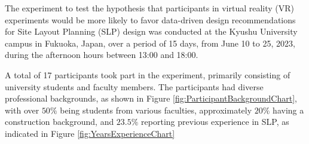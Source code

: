 
The experiment to test the hypothesis that participants in virtual reality (VR) experiments would be more likely to favor data-driven design recommendations for Site Layout Planning (SLP) design was conducted at the Kyushu University campus in Fukuoka, Japan, over a period of 15 days, from June 10 to 25, 2023, during the afternoon hours between 13:00 and 18:00.

A total of 17 participants took part in the experiment, primarily consisting of university students and faculty members.
The participants had diverse professional backgrounds, as shown in Figure \ref{fig:ParticipantBackgroundChart}, with over \(50\%\) being students from various faculties, approximately \(20\%\) having a construction background, and \(23.5\%\) reporting previous experience in SLP, as indicated in Figure \ref{fig:YearsExperienceChart}

